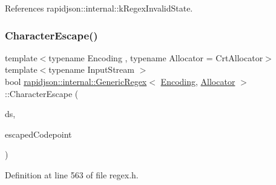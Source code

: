References rapidjson\+::internal\+::k\+Regex\+Invalid\+State.

\mbox{\label{classrapidjson_1_1internal_1_1_generic_regex_a3c70a25082040233268ad41085a26cf6}} 
\subsubsection{\texorpdfstring{CharacterEscape()}{CharacterEscape()}}
{\footnotesize\ttfamily template$<$typename Encoding , typename Allocator  = Crt\+Allocator$>$ \\
template$<$typename Input\+Stream $>$ \\
bool \mbox{\hyperlink{classrapidjson_1_1internal_1_1_generic_regex}{rapidjson\+::internal\+::\+Generic\+Regex}}$<$ \mbox{\hyperlink{classrapidjson_1_1_encoding}{Encoding}}, \mbox{\hyperlink{classrapidjson_1_1_allocator}{Allocator}} $>$\+::Character\+Escape (\begin{DoxyParamCaption}\item[{\mbox{\hyperlink{classrapidjson_1_1internal_1_1_decoded_stream}{Decoded\+Stream}}$<$ Input\+Stream, \mbox{\hyperlink{classrapidjson_1_1_encoding}{Encoding}} $>$ \&}]{ds,  }\item[{unsigned $\ast$}]{escaped\+Codepoint }\end{DoxyParamCaption})\hspace{0.3cm}{\ttfamily [private]}}



Definition at line 563 of file regex.\+h.


